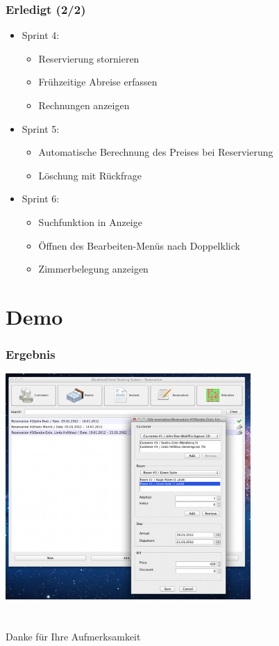 \documentclass{beamer}
\begin{document}
\begin{frame}
\frametitle{Erledigt (2/2)}
\begin{itemize}
\item  Sprint 4:
\begin{itemize}
\item  Reservierung stornieren
\item  Fr\"uhzeitige Abreise erfassen
\item  Rechnungen anzeigen
\end{itemize}
\item  Sprint 5:
\begin{itemize}
\item  Automatische Berechnung des Preises bei Reservierung
\item  L\"oschung mit R\"uckfrage
\end{itemize}
\item  Sprint 6:
\begin{itemize}
\item  Suchfunktion in Anzeige
\item  \"Offnen des Bearbeiten-Men\"us nach Doppelklick
\item  Zimmerbelegung anzeigen
\end{itemize}
\end{itemize}
\end{frame}

\section{Demo}

\begin{frame}
\frametitle{Ergebnis}
\begin{overprint}
\begin{center}
\includegraphics [width=0.7\textwidth] {img/demo.png}
\end{center}
\end{overprint}
\end{frame}

\section{}

\begin{frame}
\begin{center}
Danke f\"ur Ihre Aufmerksamkeit
\end{center}
\end{frame}
\end{document}
